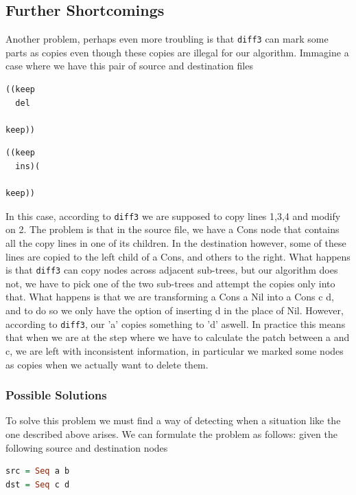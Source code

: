 \documentclass[11pt]{article}
\begin{document}
\subsection{Further Shortcomings}

Another problem, perhaps even more troubling is that \texttt{diff3} can mark 
some parts as copies even though these copies are illegal for our algorithm.
Immagine a case where we have this pair of source and destination files

\begin{lstlisting}[language=haskell]
((keep
  del

keep))
\end{lstlisting}

\begin{lstlisting}[language=haskell]
((keep
  ins)(

keep))
\end{lstlisting}

In this case, according to \texttt{diff3} we are supposed to copy lines 1,3,4 
and modify on 2. The problem is that in the source file, we have a Cons node 
that contains all the copy lines in one of its children. In the destination 
however, some of these lines are copied to the left child of a Cons, and others 
to the right. What happens is that \texttt{diff3} can copy nodes across adjacent sub-trees, 
but our algorithm does not, we have to pick one of the two sub-trees and attempt 
the copies only into that.
What happens is that we are transforming a Cons a Nil into a Cons c d, and to do 
so we only have the option of inserting d in the place of Nil. However, 
according to \texttt{diff3}, our 'a' copies something to 'd' aswell. In practice 
this means that when we are at the step where we have to calculate the patch between 
a and c, we are left with inconsistent information, in particular we marked some nodes as copies when we
actually want to delete them.

\subsubsection{Possible Solutions}

To solve this problem we must find a way of detecting when a situation like the 
one described above arises. We can formulate the problem as follows:
given the following source and destination nodes

\begin{lstlisting}[language=haskell]
src = Seq a b
dst = Seq c d
\end{lstlisting}
\end{document}
